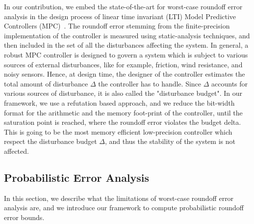 In our contribution, we embed the state-of-the-art for worst-case roundoff error analysis in the design process of linear time invariant (LTI) Model Predictive Controllers (MPC)~\cite{mpc}.
%
The roundoff error stemming from the finite-precision implementation of the controller is measured using static-analysis techniques, and then included in the set of all the disturbances affecting the system.
%
In general, a robust MPC controller is designed to govern a system which is subject to various sources of external disturbances, like for example, friction, wind resistance, and noisy sensors.
%
Hence, at design time, the designer of the controller estimates the total amount of disturbance $\Delta$ the controller has to handle.
%
Since $\Delta$ accounts for various sources of disturbance, it is also called the "disturbance budget".
%
%
In our framework, we use a refutation based approach, and we reduce the bit-width format for the arithmetic and the memory foot-print of the controller, until the saturation point is reached, where the roundoff error violates the budget delta.
%
This is going to be the most memory efficient low-precision controller which respect the disturbance budget $\Delta$, and thus the stability of the system is not affected.
%

%
%  
%  
%
%
%
%
\subsection{Probabilistic Error Analysis}
\label{sec:prob}
%
In this section, we describe what the limitations of worst-case roundoff error analysis are, and we introduce our framework to compute probabilistic roundoff error bounds.
%

